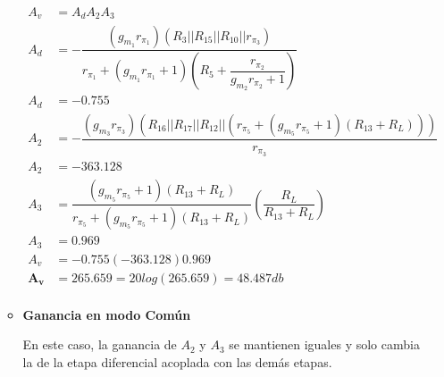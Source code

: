 \begin{enumerate}
\begin{itemize}
                \begin{align*}
                  A_v          & =A_dA_2A_3                                                                                                                                           \\[1cm]
                  A_d          & =-\dfrac{(g_{m_1}r_{\pi_1})(R_{3}||R_{15}||R_{10}||r_{\pi_3})}{r_{\pi_1}+(g_{m_1}r_{\pi_1}+1)\left(R_5+\dfrac{r_{\pi_2}}{g_{m_2}r_{\pi_2}+1}\right)} \\[0.2cm]
                  A_d          & =-0.755                                                                                                                                              \\[1cm]
                  A_2          & =-\dfrac{(g_{m_3}r_{\pi_3})(R_{16}||R_{17}||R_{12}||(r_{\pi_5}+(g_{m_5}r_{\pi_5}+1)(R_{13}+R_L)))}{r_{\pi_3}}                                        \\[0.2cm]
                  A_2          & =-363.128                                                                                                                                            \\[1cm]
                  A_3          & =\dfrac{(g_{m_5}r_{\pi_5}+1)(R_{13}+R_L)}{r_{\pi_5}+(g_{m_5}r_{\pi_5}+1)(R_{13}+R_L)}\left(\dfrac{R_L}{R_{13}+R_L}\right)                            \\[0.2cm]
                  A_3          & =0.969                                                                                                                                               \\[1cm]
                  A_v          & =-0.755(-363.128)0.969                                                                                                                               \\[0.2cm]
                  \mathbf{A_v} & =\mathbf{265.659} = 20log(265.659)=48.487 db                                                                                                         \\[0.2cm]
                \end{align*}

          \item \textbf{Ganancia en modo Común}

                En este caso, la ganancia de $A_2$ y $A_3$ se mantienen iguales y solo cambia la de la etapa diferencial acoplada con las demás etapas.


\end{itemize}
\end{enumerate}
